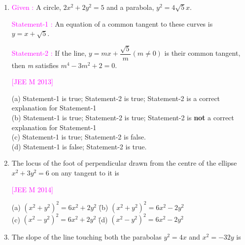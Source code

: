 \documentclass[journal,12pt,twocolumn]{IEEEtran}
\theoremstyle{remark}
\begin{document}
\begin{enumerate}[label=\textcolor{magenta}{\arabic*.}]
    \hfill{\textcolor{magenta}{[JEE M 2013]}}
    
    \begin{tabbing}
        (a) $x^2+y^2-6y-7=0$ \hspace{0em} \= (b) $x^2+y^2-6y+7=0$ \\
        (c) $x^2+y^2-6y-5=0$ \hspace{0em} \= (d) $x^2+y^2-6y+5=0$ \\
    \end{tabbing}
    \item
    \textcolor{magenta}{Given : }A circle, $2x^2+2y^2=5$ and a parabola, $y^2=4\sqrt{5}x$.
    
    \textcolor{magenta}{Statement-1 :} An equation of a common tangent to these curves is $y=x+\sqrt{5}$.
    
    \textcolor{magenta}{Statement-2 :} If the line, $y=mx+\dfrac{\sqrt{5}}{m} (m\neq0)$ is their common tangent, then \textit{m} satisfies $m^4-3m^2+2=0$.

    \hfill{\textcolor{magenta}{[JEE M 2013]}}
    
    (a) Statement-1 is true; Statement-2 is true; Statement-2
    is a correct explanation for Statement-1\\
    (b) Statement-1 is true; Statement-2 is true; Statement-2
    is \textbf{not} a correct explanation for Statement-1\\
    (c) Statement-1 is true; Statement-2 is false.\\
    (d) Statement-1 is false; Statement-2 is true.\\
    \item The locus of the foot of perpendicular drawn from the centre of the ellipse $x^2+3y^2=6$ on any tangent to it is
    
    \hfill{\textcolor{magenta}{[JEE M 2014]}}
    
    \begin{tabbing}
        (a) $\left(x^2+y^2\right)^2=6x^2+2y^2$ \hspace{0em} \= (b) $\left(x^2+y^2\right)^2=6x^2-2y^2$ \\
        (c) $\left(x^2-y^2\right)^2=6x^2+2y^2$ \hspace{0em} \= (d) $\left(x^2-y^2\right)^2=6x^2-2y^2$ \\
    \end{tabbing}

    \item The slope of the line touching both the parabolas $y^2=4x$ and $x^2=-32y$ is


\end{enumerate}
\end{document}
